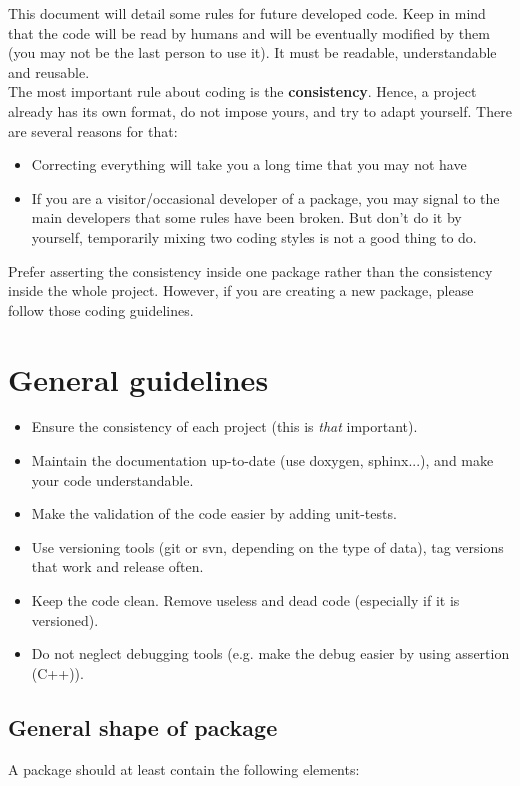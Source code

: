 This document will detail some rules for future developed code.
Keep in mind that the code will be read by humans and will be eventually modified by them (you may not be the last person to use it). 
It must be readable, understandable and reusable.\\

The most important rule about coding is the \textbf{consistency}.
Hence, a project already has its own format, do not impose yours, and try to adapt yourself.
There are several reasons for that:
\begin{itemize}
\item Correcting everything will take you a long time that you may not have
\item If you are a visitor/occasional developer of a package, you may signal to the main developers that some rules have been broken. But don't do it by yourself, temporarily mixing two coding styles is not a good thing to do.
\end{itemize}
Prefer asserting the consistency inside one package rather than the consistency inside the whole project.
However, if you are creating a new package, please follow those coding guidelines.

\section{General guidelines}
\label{section:general-guidelines}
\begin{itemize}
\item Ensure the consistency of each project (this is \textit{that} important).
\item Maintain the documentation up-to-date (use doxygen, sphinx...), and make your code understandable.
\item Make the validation of the code easier by adding unit-tests.
\item Use versioning tools (git or svn, depending on the type of data), tag versions that work and release often.
\item Keep the code clean. Remove useless and dead code (especially if it is versioned).
\item Do not neglect debugging tools (e.g. make the debug easier by using assertion (C++)).
\end{itemize}

\subsection{General shape of package}
A package should at least contain the following elements:

